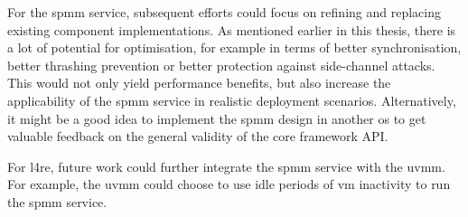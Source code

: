 For the \ac{spmm} service, subsequent efforts could focus on refining and replacing existing component implementations.
As mentioned earlier in this thesis, there is a lot of potential for optimisation, for example in terms of better synchronisation, better thrashing prevention or better protection against side-channel attacks.
This would not only yield performance benefits, but also increase the applicability of the \ac{spmm} service in realistic deployment scenarios.
Alternatively, it might be a good idea to implement the \ac{spmm} design in another \ac{os} to get valuable feedback on the general validity of the core framework API.

For \ac{l4re}, future work could further integrate the \ac{spmm} service with the \ac{uvmm}.
For example, the \ac{uvmm} could choose to use idle periods of \ac{vm} inactivity to run the \ac{spmm} service.
